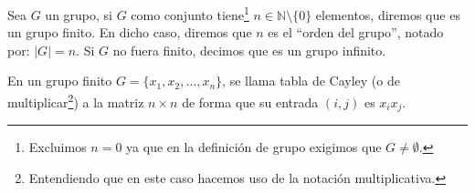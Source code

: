 \begin{definicion}
    Sea $G$ un grupo, si $G$ como conjunto tiene\footnote{Excluimos $n= 0$ ya que en la definición de grupo exigimos que $G\neq \emptyset $.} $n\in \mathbb{N}\setminus\{0\}$ elementos, diremos que es un grupo finito. En dicho caso, diremos que $n$ es el ``orden del grupo'', notado por: $|G| = n$.\newline
    Si $G$ no fuera finito, decimos que es un grupo infinito.
\end{definicion}

\begin{definicion}
    En un grupo finito $G=\{x_1,x_2,\ldots,x_n\}$, se llama tabla de Cayley (o de multiplicar\footnote{Entendiendo que en este caso hacemos uso de la notación multiplicativa.}) a la matriz $n\times n$ de forma que su entrada $(i,j)$ es $x_ix_j$.
\end{definicion}

